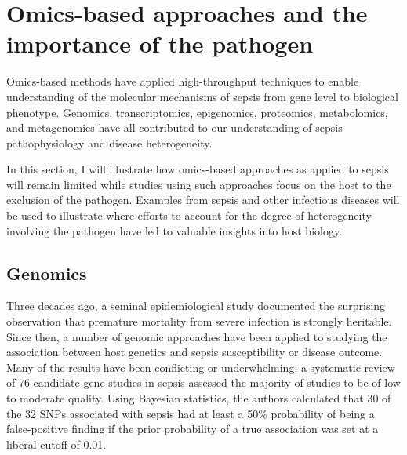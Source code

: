 \section{Omics-based approaches and the importance of the pathogen}

Omics-based methods have applied high-throughput techniques to enable understanding of the molecular mechanisms of sepsis from gene level to biological phenotype. Genomics, transcriptomics, epigenomics, proteomics, metabolomics, and metagenomics have all contributed to our understanding of sepsis pathophysiology and disease heterogeneity. 

In this section, I will illustrate how omics-based approaches as applied to sepsis will remain limited while studies using such approaches focus on the host to the exclusion of the pathogen. Examples from sepsis and other infectious diseases will be used to illustrate where efforts to account for the degree of heterogeneity involving the pathogen have led to valuable insights into host biology. 

\subsection{Genomics}
Three decades ago, a seminal epidemiological study \parencite{Sorensen1988} documented the surprising observation that premature mortality from severe infection is strongly heritable. Since then, a number of genomic approaches have been applied to studying the association between host genetics and sepsis susceptibility or disease outcome. Many of the results have been conflicting or underwhelming; a systematic review \parencite{Clark2006} of 76 candidate gene studies in sepsis assessed the majority of studies to be of low to moderate quality. Using Bayesian statistics, the authors calculated that 30 of the 32 SNPs associated with sepsis had at least a 50\% probability of being a false-positive finding if the prior probability of a true association was set at a liberal cutoff of 0.01.

